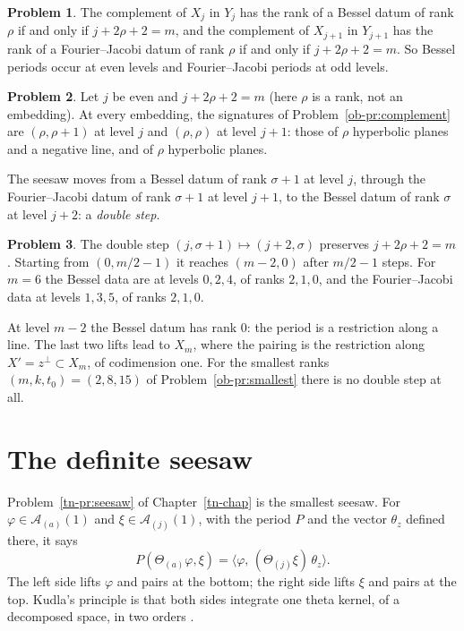 \documentclass[reqno]{amsart}
\newcounter{chap}
\theoremstyle{definition}
\newtheorem{problem}{Problem}[section]
\theoremstyle{plain}
\theoremstyle{remark}
\newcommand{\Ac}{\mathcal A}
\begin{document}
\begin{problem}\label{pr:ranks}
The complement of \(X_j\) in \(Y_j\) has the rank of a Bessel datum of rank \(\rho\) if and only if \(j+2\rho+2=m\), and the complement of \(X_{j+1}\) in \(Y_{j+1}\) has the rank of a Fourier--Jacobi datum of rank \(\rho\) if and only if \(j+2\rho+2=m\).  So Bessel periods occur at even levels and Fourier--Jacobi periods at odd levels.
\end{problem}

\begin{problem}\label{pr:signatures}
Let \(j\) be even and \(j+2\rho+2=m\) (here \(\rho\) is a rank, not an embedding).  At every embedding, the signatures of Problem~\ref{ob-pr:complement} are \((\rho,\rho+1)\) at level \(j\) and \((\rho,\rho)\) at level \(j+1\): those of \(\rho\) hyperbolic planes and a negative line, and of \(\rho\) hyperbolic planes.
\end{problem}

The seesaw moves from a Bessel datum of rank \(\sigma+1\) at level \(j\), through the Fourier--Jacobi datum of rank \(\sigma+1\) at level \(j+1\), to the Bessel datum of rank \(\sigma\) at level \(j+2\): a \emph{double step}.

\begin{problem}\label{pr:double-steps}
The double step \((j,\sigma+1)\mapsto(j+2,\sigma)\) preserves \(j+2\rho+2=m\).  Starting from \((0,m/2-1)\) it reaches \((m-2,0)\) after \(m/2-1\) steps.  For \(m=6\) the Bessel data are at levels \(0,2,4\), of ranks \(2,1,0\), and the Fourier--Jacobi data at levels \(1,3,5\), of ranks \(2,1,0\).
\end{problem}

At level \(m-2\) the Bessel datum has rank \(0\): the period is a restriction along a line.  The last two lifts lead to \(X_m\), where the pairing is the restriction along \(X'=z^\perp\subset X_m\), of codimension one.  For the smallest ranks \((m,k,t_0)=(2,8,15)\) of Problem~\ref{ob-pr:smallest} there is no double step at all.

\section{The definite seesaw}\label{sec:definite}

Problem~\ref{tn-pr:seesaw} of Chapter~\ref{tn-chap} is the smallest seesaw.  For \(\varphi\in\Ac_{(a)}(1)\) and \(\xi\in\Ac_{(j)}(1)\), with the period \(P\) and the vector \(\theta_z\) defined there, it says
\[
 P(\Theta_{(a)}\varphi,\xi)=\bigl\langle\varphi,\,(\Theta_{(j)}\xi)\,\theta_z\bigr\rangle .
\]
The left side lifts \(\varphi\) and pairs at the bottom; the right side lifts \(\xi\) and pairs at the top.  Kudla's principle is that both sides integrate one theta kernel, of a decomposed space, in two orders \cite{Ku}.
\end{document}
